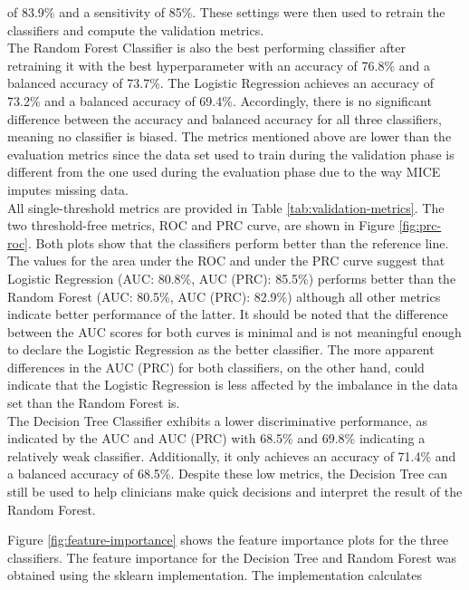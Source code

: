 of 83.9\% and a sensitivity of 85\%. These settings were then used to retrain 
the classifiers and compute the validation metrics.
\\
The Random Forest Classifier is also the best performing classifier after 
retraining it with the best hyperparameter with an accuracy of 76.8\% and a 
balanced accuracy of 73.7\%. The Logistic Regression achieves an accuracy of 
73.2\% and a balanced accuracy of 69.4\%. Accordingly, there is 
no significant difference between the accuracy and balanced accuracy for 
all three classifiers, meaning no classifier is biased.
The metrics mentioned above are lower than the evaluation metrics since the 
data 
set used to train during the validation phase is different from the one used 
during the evaluation phase due to the way MICE imputes missing data.
\\
All single-threshold metrics are provided in Table \ref{tab:validation-metrics}.
The two threshold-free metrics, ROC and PRC curve, are shown in Figure 
\ref{fig:prc-roc}. Both plots show that the classifiers perform better than the 
reference line. The values for the area under the ROC and under the PRC curve 
suggest that Logistic Regression (AUC: 80.8\%, AUC (PRC): 85.5\%) performs 
better than the Random Forest (AUC: 80.5\%, AUC (PRC): 82.9\%) although all 
other metrics indicate better performance of the latter. It 
should be noted that the difference between the AUC scores for both curves is 
minimal and is not meaningful enough to declare the Logistic Regression as the 
better classifier. The more apparent differences in the AUC (PRC) for both 
classifiers, on the other hand, could indicate that the Logistic Regression is 
less affected by the imbalance in the data set than the Random Forest is.
\\
The Decision Tree Classifier exhibits a lower discriminative performance,
as indicated by the AUC and AUC (PRC) with 68.5\% and 69.8\% 
indicating a relatively weak classifier. Additionally, it only 
achieves an accuracy of 71.4\% and a balanced accuracy of 68.5\%. Despite 
these low metrics, the Decision Tree can still be used to 
help clinicians make quick decisions and interpret the result of the Random 
Forest.
\par
Figure \ref{fig:feature-importance} shows the feature importance plots for the 
three classifiers. The feature importance for the Decision Tree and Random 
Forest was obtained using the sklearn implementation. The implementation 
calculates 
